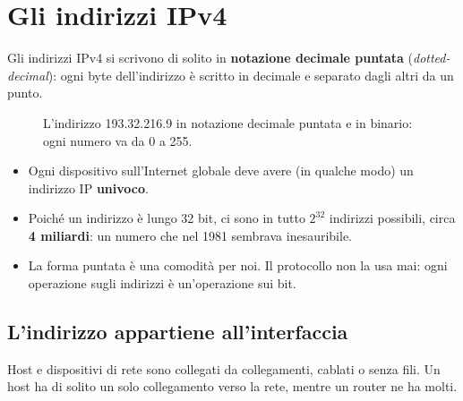 \section{Gli indirizzi IPv4}

Gli indirizzi IPv4 si scrivono di solito in \textbf{notazione decimale puntata} (\emph{dotted-decimal}): ogni byte
dell'indirizzo è scritto in decimale e separato dagli altri da un punto.

\begin{figure}[H]
\centering
{}
\caption{L'indirizzo 193.32.216.9 in notazione decimale puntata e in binario: ogni numero va da 0 a 255.}
\end{figure}

\begin{itemize}
    \item Ogni dispositivo sull'Internet globale deve avere (in qualche modo) un indirizzo IP \textbf{univoco}.
    \item Poiché un indirizzo è lungo 32 bit, ci sono in tutto $2^{32}$ indirizzi possibili, circa \textbf{4 miliardi}: un
          numero che nel 1981 sembrava inesauribile.
    \item La forma puntata è una comodità per noi. Il protocollo non la usa mai: ogni operazione sugli indirizzi è
          un'operazione sui bit.
\end{itemize}

\subsection{L'indirizzo appartiene all'interfaccia}

Host e dispositivi di rete sono collegati da collegamenti, cablati o senza fili. Un host ha di solito un solo
collegamento verso la rete, mentre un router ne ha molti.

